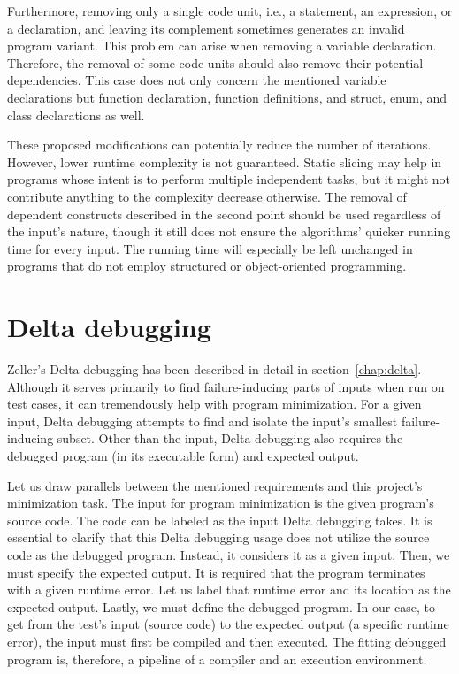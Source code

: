 Furthermore, removing only a single code unit, i.e., a statement, 
an expression, or a declaration, and leaving its complement sometimes 
generates an invalid program variant.
This problem can arise when removing a variable declaration.
Therefore, the removal of some code units should also remove their potential 
dependencies.
This case does not only concern the mentioned variable declarations but 
function declaration, function definitions, and struct, enum, 
and class declarations as well.

These proposed modifications can potentially reduce the number of iterations.
However, lower runtime complexity is not guaranteed.
Static slicing may help in programs whose intent is to perform multiple 
independent tasks, but it might not contribute anything to the complexity 
decrease otherwise.
The removal of dependent constructs described in the second point should be 
used regardless of the input's nature, though it still does not ensure 
the algorithms' quicker running time for every input.
The running time will especially be left unchanged in programs that do not 
employ structured or object-oriented programming.

\section{Delta debugging}

Zeller's Delta debugging \cite{Zeller99, Zeller02, Zeller01} has been 
described in detail in section~\ref{chap:delta}.
Although it serves primarily to find failure-inducing parts of inputs when 
run on test cases, it can tremendously help with program minimization.
For a given input, Delta debugging attempts to find and isolate the input's 
smallest failure-inducing subset.
Other than the input, Delta debugging also requires the debugged program 
(in its executable form) and expected output.

Let us draw parallels between the mentioned requirements and this project's 
minimization task.
The input for program minimization is the given program's source code.
The code can be labeled as the input Delta debugging takes.
It is essential to clarify that this Delta debugging usage does not utilize 
the source code as the debugged program.
Instead, it considers it as a given input.
Then, we must specify the expected output.
It is required that the program terminates with a given runtime error.
Let us label that runtime error and its location as the expected output.
Lastly, we must define the debugged program.
In our case, to get from the test's input (source code) to the expected 
output (a specific runtime error), the input must first be compiled 
and then executed.
The fitting debugged program is, therefore, a pipeline of a compiler and 
an execution environment.

